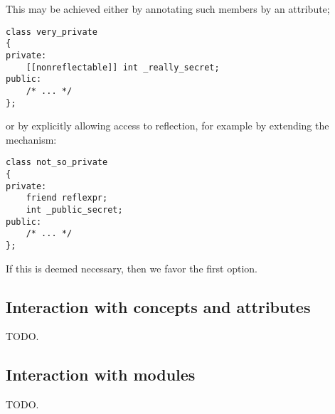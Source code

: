 This may be achieved either by annotating such members by an attribute;

\begin{verbatim}
class very_private
{
private:
	[[nonreflectable]] int _really_secret;
public:
	/* ... */
};
\end{verbatim}

or by explicitly allowing access to reflection, for example by extending
the \verb@friend@ mechanism:

\begin{verbatim}
class not_so_private
{
private:
	friend reflexpr;
	int _public_secret;
public:
	/* ... */
};
\end{verbatim}

If this is deemed necessary, then we favor the first option.

\subsection{Interaction with concepts and attributes}

TODO.

\subsection{Interaction with modules}

TODO.

